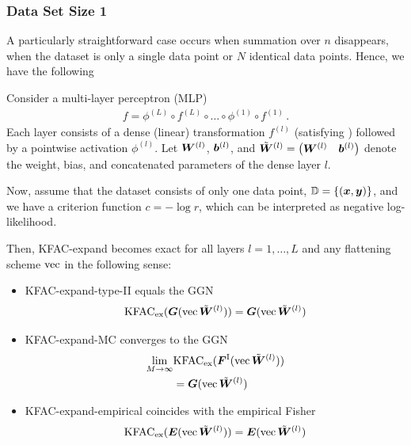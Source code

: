 \switchcolumn[1]
\switchcolumn[0]

\subsubsection{Data Set Size 1}
A particularly straightforward case occurs when summation over $n$ disappears, \ie when the dataset is only a single data point or $N$ identical data points.
Hence, we have the following

\begin{test}\label{test:kfac_expand_linear_no_weight_sharing_batch_size_1}
  Consider a multi-layer perceptron (MLP)
  \begin{align*}
    f = \phi^{(L)} \circ f^{(L)} \circ \ldots \circ \phi^{(1)} \circ f^{(1)}\,.
  \end{align*}
  Each layer consists of a dense (linear) transformation $f^{(l)}$ (satisfying ) followed by a pointwise activation $\phi^{(l)}$.
  Let $\mW^{(l)}$, $\vb^{(l)}$, and $\tilde{\mW}^{(l)} = \begin{pmatrix} \mW^{(l)} & \vb^{(l)} \end{pmatrix}$ denote the weight, bias, and concatenated parameters of the dense layer $l$.

  Now, assume that the dataset consists of only one data point, $\sD = \{ (\vx, \vy) \}$, and we have a criterion function $c = - \log r$, which can be interpreted as negative log-likelihood.

  Then, KFAC-expand becomes exact for all layers $l = 1, \dots, L$ and any flattening scheme $\vec$ in the following sense:
  \begin{itemize}[leftmargin=0.5cm]
  \item KFAC-expand-type-II equals the GGN
    \begin{align*}
      \kfac_{\text{ex}}(\mG(\vec \tilde{\mW}^{(l)})) = \mG(\vec \tilde{\mW}^{(l)})
    \end{align*}
  \item KFAC-expand-MC converges to the GGN
    \begin{align*}
      \lim_{M \to \infty} &\kfac_{\text{ex}}(\mF^{\text{I}}(\vec\tilde{\mW}^{(l)}))
      \\
                          &= \mG(\vec \tilde{\mW}^{(l)})
    \end{align*}
  \item KFAC-expand-empirical coincides with the empirical Fisher
    \begin{align*}
      \kfac_{\text{ex}}(\mE(\vec\tilde{\mW}^{(l)})) = \mE(\vec \tilde{\mW}^{(l)})
    \end{align*}
  \end{itemize}
\end{test}

